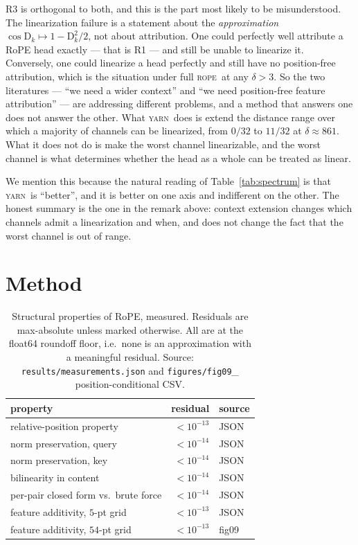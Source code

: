 \documentclass{article}
\theoremstyle{plain}
\theoremstyle{remark}
\newcommand{\rope}{\textsc{rope}}
\newcommand{\yarn}{\textsc{yarn}}
\newcommand{\D}{\mathrm{D}_k}
\begin{document}
R3 is orthogonal to both, and this is the part most likely to be
misunderstood. The linearization failure is a statement about the
\emph{approximation} $\cos \D \mapsto 1 - \D^2/2$, not about attribution. One
could perfectly well attribute a RoPE head exactly --- that is R1 --- and still
be unable to linearize it. Conversely, one could linearize a head perfectly and
still have no position-free attribution, which is the situation under full
\rope\ at any $\delta > 3$. So the two literatures --- ``we need a wider
context'' and ``we need position-free feature attribution'' --- are addressing
different problems, and a method that answers one does not answer the other.
What \yarn\ does is extend the distance range over which a majority of channels
can be linearized, from $0/32$ to $11/32$ at $\delta \approx 861$. What it does
not do is make the worst channel linearizable, and the worst channel is what
determines whether the head as a whole can be treated as linear.

We mention this because the natural reading of Table~\ref{tab:spectrum} is
that \yarn\ is ``better'', and it is better on one axis and indifferent on the
other. The honest summary is the one in the remark above: context extension
changes which channels admit a linearization and when, and does not change the
fact that the worst channel is out of range.



\section{Method}
\label{app:method}

\begin{table}[t]
  \centering
  \caption{Structural properties of RoPE, measured. Residuals are
    max-absolute unless marked otherwise. All are at the float64 roundoff
    floor, i.e.\ none is an approximation with a meaningful residual.
    Source: \texttt{results/measurements.json} and
    \texttt{figures/fig09}\allowbreak\emph{\_}\allowbreak
    position-conditional CSV.}
  \label{tab:exact}
  \setlength{\tabcolsep}{4.5pt}
  \begin{tabular}{lrl}
    \toprule
    property & residual & source \\
    \midrule
    relative-position property & $<10^{-13}$ & JSON \\
    norm preservation, query & $<10^{-14}$ & JSON \\
    norm preservation, key & $<10^{-14}$ & JSON \\
    bilinearity in content & $<10^{-14}$ & JSON \\
    per-pair closed form vs.\ brute force & $<10^{-14}$ & JSON \\
    \midrule
    feature additivity, $5$-pt grid & $<10^{-13}$ & JSON \\
    feature additivity, $54$-pt grid & $<10^{-13}$ & fig09 \\
    \bottomrule
  \end{tabular}
\end{table}
\end{document}
